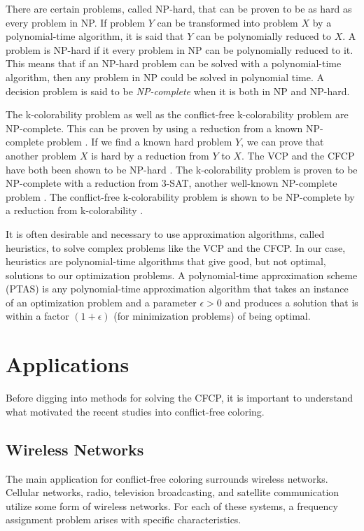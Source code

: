 \documentclass{sig-alternate}
\begin{document}
There are certain problems, called NP-hard, that can be proven to be as hard as every problem in NP. If problem $Y$ can be transformed into problem $X$ by a polynomial-time algorithm, it is said that $Y$ can be polynomially reduced to $X$. A problem is NP-hard if it every problem in NP can be polynomially reduced to it. This means that if an NP-hard problem can be solved with a polynomial-time algorithm, then any problem in NP could be solved in polynomial time. A decision problem is said to be \emph{NP-complete} when it is both in NP and NP-hard.

The k-colorability problem as well as the conflict-free k-colorability problem are NP-complete. This can be proven by using a reduction from a known NP-complete problem \cite{garey2002computers}. If we find a known hard problem $Y$, we can prove that another problem $X$ is hard by a reduction from $Y$ to $X$. The VCP and the CFCP have both been shown to be NP-hard \cite{abel2017three,moret1998theory}. The k-colorability problem is proven to be NP-complete with a reduction from 3-SAT, another well-known NP-complete problem \cite{sharma2012new}. The conflict-free k-colorability problem is shown to be NP-complete by a reduction from k-colorability \cite{abel2017three}.

It is often desirable and necessary to use approximation algorithms, called heuristics, to solve complex problems like the VCP and the CFCP. In our case, heuristics are polynomial-time algorithms that give good, but not optimal, solutions to our optimization problems. A polynomial-time approximation scheme (PTAS) is any polynomial-time approximation algorithm that takes an instance of an optimization problem and a parameter $\epsilon > 0$ and produces a solution that is within a factor $(1 + \epsilon)$ (for minimization problems) of being optimal.

\vspace{-0.2cm}

\section{Applications}
Before digging into methods for solving the CFCP, it is important to understand what motivated the recent studies into conflict-free coloring.

\subsection{Wireless Networks}
The main application for conflict-free coloring surrounds wireless networks. Cellular networks, radio, television broadcasting, and satellite communication utilize some form of wireless networks. For each of these systems, a frequency assignment problem arises with specific characteristics.
\end{document}
